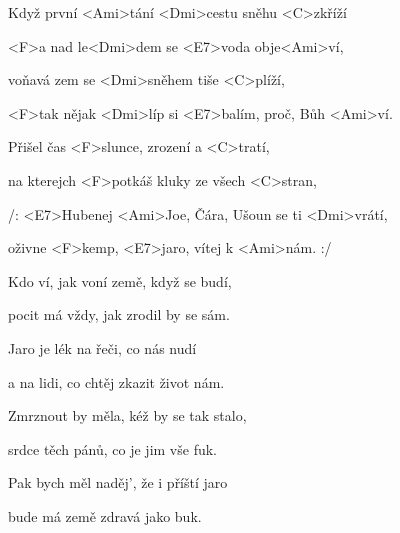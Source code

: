 

\zs
Když první <Ami>tání <Dmi>cestu sněhu <C>zkříží

<F>a nad le<Dmi>dem se <E7>voda obje<Ami>ví,

voňavá zem se <Dmi>sněhem tiše <C>plíží,

<F>tak nějak <Dmi>líp si <E7>balím, proč, Bůh <Ami>ví.
\ks



\zr
Přišel čas <F>slunce, zrození a <C>tratí,

na kterejch <F>potkáš kluky ze všech <C>stran,

/: <E7>Hubenej <Ami>Joe, Čára, Ušoun se ti <Dmi>vrátí,

oživne <F>kemp, <E7>jaro, vítej k <Ami>nám. :/
\kr

\zs
Kdo ví, jak voní země, když se budí,

pocit má vždy, jak zrodil by se sám.

Jaro je lék na řeči, co nás nudí

a na lidi, co chtěj zkazit život nám.
\ks


\zr \kr


\zs
Zmrznout by měla, kéž by se tak stalo,

srdce těch pánů, co je jim vše fuk.

Pak bych měl naděj', že i příští jaro

bude má země zdravá jako buk.
\ks

\zr \kr

\kp
